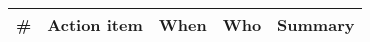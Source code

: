 \begin{longtable}{ccccX}
\toprule
\textbf{\#} & \textbf{Action item} & \textbf{When} & \textbf{Who} & \textbf{Summary} 


\\ \bottomrule
\end{longtable}
